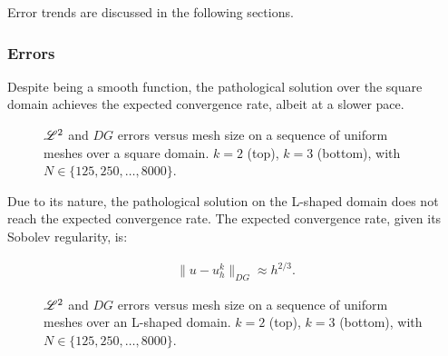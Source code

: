 Error trends are discussed in the following sections.

\newpage
\subsubsection{Errors}

Despite being a smooth function, the pathological solution over the square domain achieves the expected convergence rate, albeit at a slower pace.

\begin{figure}[!ht]
    
    
    \caption{$\mathscr{L}^2$ and $DG$ errors versus mesh size on a sequence of uniform meshes over a square domain. $k = 2$ (top), $k = 3$ (bottom), with $N \in \{125, 250, \dots, 8000\}$.}
\end{figure}

\newpage

Due to its nature, the pathological solution on the L-shaped domain does not reach the expected convergence rate. The expected convergence rate, given its Sobolev regularity, is:

\begin{gather}
    \lVert u - u^k_h \rVert_{DG} \approx h^{2/3}.
\end{gather}

\begin{figure}[!ht]
    
    
    \caption{$\mathscr{L}^2$ and $DG$ errors versus mesh size on a sequence of uniform meshes over an L-shaped domain. $k = 2$ (top), $k = 3$ (bottom), with $N \in \{125, 250, \dots, 8000\}$.}
\end{figure}
